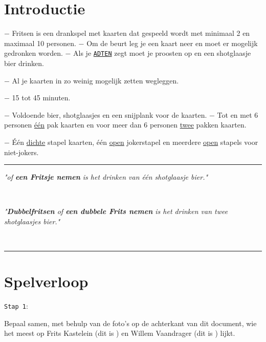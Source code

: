 \vspace{-0.5cm}
\section*{Introductie}
$-$ Fritsen is een drankspel met kaarten dat gespeeld wordt met minimaal 2 en maximaal 10 personen. \newline $-$ Om de beurt leg je een kaart neer en moet er mogelijk gedronken worden. \newline $-$ Als je \ul{\texttt{ADTEN}} zegt moet je proosten op  en een shotglaasje bier drinken. 
\vspace*{-0.22cm} 

$-$ Al je kaarten in zo weinig mogelijk zetten wegleggen.

\vspace*{-0.22cm} 

$-$ 15 tot 45 minuten.

\vspace*{-0.22cm} 

$-$ Voldoende bier, shotglaasjes en een snijplank voor de kaarten. \newline $-$ Tot en met 6 personen \ul{\'e\'en} pak kaarten en voor meer dan 6 personen \ul{twee} pakken kaarten.

\vspace*{-0.22cm} 

$-$ \'E\'en \ul{dichte} stapel kaarten, \'e\'en \ul{open} jokerstapel en meerdere \ul{open} stapels voor niet-jokers.

\noindent\rule{\textwidth}{1pt}
\centerline{\textit{"\Fritsen of \textbf{een Fritsje nemen} is het drinken van één shotglaasje bier."}} \\
\centerline{\textit{"\textbf{Dubbelfritsen} of \textbf{een dubbele Frits nemen} is het drinken van twee shotglaasjes bier."}} \vspace*{-0.7cm}  \\
\noindent\rule{\textwidth}{1pt}

\vspace*{-0.45cm}

\section*{Spelverloop}
\label{hoofdstuk:introductie}
\begin{minipage}[t]{.09\textwidth}
\texttt{Stap 1}:
\end{minipage}
\hfill
\begin{minipage}[t]{.91\textwidth}
Bepaal samen, met behulp van de foto's op de achterkant van dit document, wie het meest op Frits Kastelein (dit is \FritsN) en Willem Vaandrager (dit is \WillemN
) lijkt. \\
\end{minipage}

